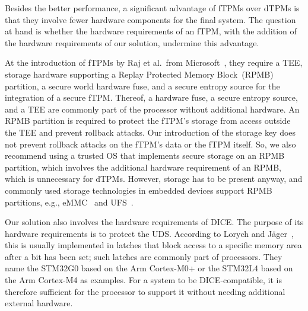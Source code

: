 Besides the better performance, a significant advantage of \acp{fTPM} over \acp{dTPM} is that they involve fewer hardware components for the final system.
The question at hand is whether the hardware requirements of an fTPM, with the addition of the hardware requirements of our solution, undermine this advantage.

At the introduction of \acp{fTPM} by Raj et al.\ from Microsoft~\cite{Raj2015}, they require a TEE, storage hardware supporting a Replay Protected Memory Block~(RPMB) partition, a secure world hardware fuse, and a secure entropy source for the integration of a secure \ac{fTPM}\@.
Thereof, a hardware fuse, a secure entropy source, and a TEE are commonly part of the processor without additional hardware.
An RPMB partition is required to protect the fTPM's storage from access outside the TEE and prevent rollback attacks.
Our introduction of the storage key does not prevent rollback attacks on the fTPM's data or the fTPM itself.
So, we also recommend using a trusted OS that implements secure storage on an RPMB partition, which involves the additional hardware requirement of an RPMB, which is unnecessary for \acp{dTPM}.
However, storage has to be present anyway, and commonly used storage technologies in embedded devices support RPMB partitions, e.g., eMMC~\cite{eMMC} and UFS~\cite{UFS}.




Our solution also involves the hardware requirements of DICE\@.
The purpose of its hardware requirements is to protect the \ac{UDS}\@.
According to Lorych and Jäger~\cite{Lorych2022}, this is usually implemented in latches that block access to a specific memory area after a bit has been set; such latches are commonly part of processors.
They name the STM32G0 based on the Arm Cortex-M0+ or the STM32L4 based on the Arm Cortex-M4 as examples.
For a system to be DICE-compatible, it is therefore sufficient for the processor to support it without needing additional external hardware.

